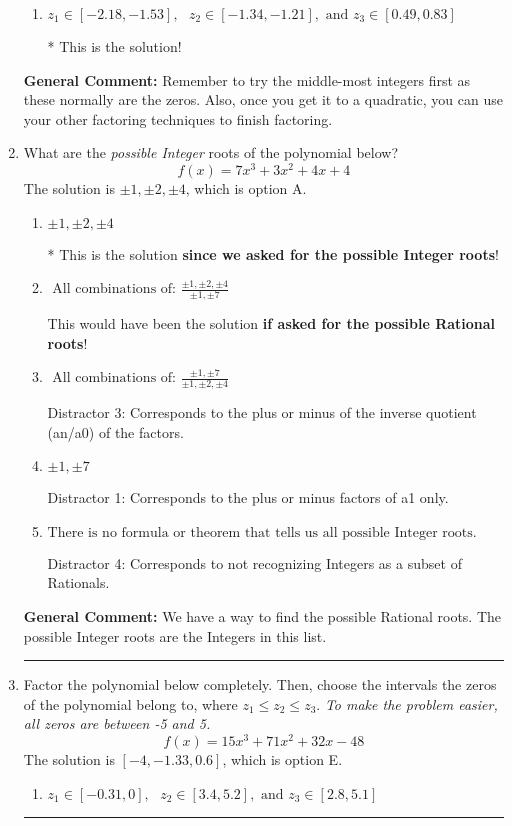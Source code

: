 \documentclass{extbook}[14pt]
\newcommand{\litem}[1]{\item #1

\rule{\textwidth}{0.4pt}}
\begin{document}
\begin{enumerate}
{\begin{enumerate}[label=\Alph*.]
 Distractor 1: Corresponds to negatives of all zeros.
\item \( z_1 \in [-2.18, -1.53], \text{   }  z_2 \in [-1.34, -1.21], \text{   and   } z_3 \in [0.49, 0.83] \)

* This is the solution!
\end{enumerate}

\textbf{General Comment:} Remember to try the middle-most integers first as these normally are the zeros. Also, once you get it to a quadratic, you can use your other factoring techniques to finish factoring.
}
\litem{
What are the \textit{possible Integer} roots of the polynomial below?
\[ f(x) = 7x^{3} +3 x^{2} +4 x + 4 \]The solution is \( \pm 1,\pm 2,\pm 4 \), which is option A.\begin{enumerate}[label=\Alph*.]
\item \( \pm 1,\pm 2,\pm 4 \)

* This is the solution \textbf{since we asked for the possible Integer roots}!
\item \( \text{ All combinations of: }\frac{\pm 1,\pm 2,\pm 4}{\pm 1,\pm 7} \)

This would have been the solution \textbf{if asked for the possible Rational roots}!
\item \( \text{ All combinations of: }\frac{\pm 1,\pm 7}{\pm 1,\pm 2,\pm 4} \)

 Distractor 3: Corresponds to the plus or minus of the inverse quotient (an/a0) of the factors. 
\item \( \pm 1,\pm 7 \)

 Distractor 1: Corresponds to the plus or minus factors of a1 only.
\item \( \text{There is no formula or theorem that tells us all possible Integer roots.} \)

 Distractor 4: Corresponds to not recognizing Integers as a subset of Rationals.
\end{enumerate}

\textbf{General Comment:} We have a way to find the possible Rational roots. The possible Integer roots are the Integers in this list.
}
\litem{
Factor the polynomial below completely. Then, choose the intervals the zeros of the polynomial belong to, where $z_1 \leq z_2 \leq z_3$. \textit{To make the problem easier, all zeros are between -5 and 5.}
\[ f(x) = 15x^{3} +71 x^{2} +32 x -48 \]The solution is \( [-4, -1.33, 0.6] \), which is option E.\begin{enumerate}[label=\Alph*.]
\item \( z_1 \in [-0.31, 0], \text{   }  z_2 \in [3.4, 5.2], \text{   and   } z_3 \in [2.8, 5.1] \)


\end{enumerate}}
\end{enumerate}
\end{document}
